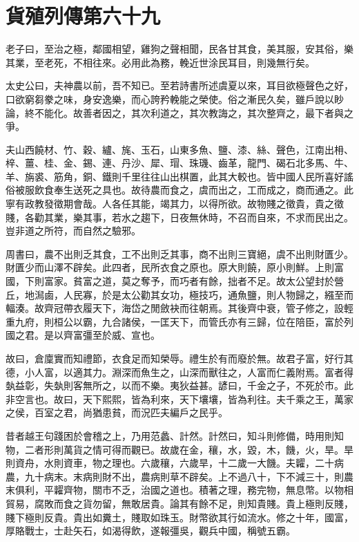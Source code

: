 \chapter{貨殖列傳第六十九}

老子曰，至治之極，鄰國相望，雞狗之聲相聞，民各甘其食，美其服，安其俗，樂其業，至老死，不相往來。必用此為務，輓近世涂民耳目，則幾無行矣。

太史公曰，夫神農以前，吾不知已。至若詩書所述虞夏以來，耳目欲極聲色之好，口欲窮芻豢之味，身安逸樂，而心誇矜輓能之榮使。俗之漸民久矣，雖戶說以眇論，終不能化。故善者因之，其次利道之，其次教誨之，其次整齊之，最下者與之爭。

夫山西饒材、竹、穀、纑、旄、玉石，山東多魚、鹽、漆、絲、聲色，江南出枏、梓、薑、桂、金、錫、連、丹沙、犀、瑁、珠璣、齒革，龍門、碣石北多馬、牛、羊、旃裘、筋角，銅、鐵則千里往往山出棋置，此其大較也。皆中國人民所喜好謠俗被服飲食奉生送死之具也。故待農而食之，虞而出之，工而成之，商而通之。此寧有政教發徵期會哉。人各任其能，竭其力，以得所欲。故物賤之徵貴，貴之徵賤，各勸其業，樂其事，若水之趨下，日夜無休時，不召而自來，不求而民出之。豈非道之所符，而自然之驗邪。

周書曰，農不出則乏其食，工不出則乏其事，商不出則三寶絕，虞不出則財匱少。財匱少而山澤不辟矣。此四者，民所衣食之原也。原大則饒，原小則鮮。上則富國，下則富家。貧富之道，莫之奪予，而巧者有餘，拙者不足。故太公望封於營丘，地澙鹵，人民寡，於是太公勸其女功，極技巧，通魚鹽，則人物歸之，繦至而輻湊。故齊冠帶衣履天下，海岱之閒斂袂而往朝焉。其後齊中衰，管子修之，設輕重九府，則桓公以霸，九合諸侯，一匡天下，而管氏亦有三歸，位在陪臣，富於列國之君。是以齊富彊至於威、宣也。

故曰，倉廩實而知禮節，衣食足而知榮辱。禮生於有而廢於無。故君子富，好行其德，小人富，以適其力。淵深而魚生之，山深而獸往之，人富而仁義附焉。富者得埶益彰，失埶則客無所之，以而不樂。夷狄益甚。諺曰，千金之子，不死於市。此非空言也。故曰，天下熙熙，皆為利來，天下壤壤，皆為利往。夫千乘之王，萬家之侯，百室之君，尚猶患貧，而況匹夫編戶之民乎。

昔者越王句踐困於會稽之上，乃用范蠡、計然。計然曰，知斗則修備，時用則知物，二者形則萬貨之情可得而觀已。故歲在金，穰，水，毀，木，饑，火，旱。旱則資舟，水則資車，物之理也。六歲穰，六歲旱，十二歲一大饑。夫糶，二十病農，九十病末。末病則財不出，農病則草不辟矣。上不過八十，下不減三十，則農末俱利，平糶齊物，關市不乏，治國之道也。積著之理，務完物，無息幣。以物相貿易，腐敗而食之貨勿留，無敢居貴。論其有餘不足，則知貴賤。貴上極則反賤，賤下極則反貴。貴出如糞土，賤取如珠玉。財幣欲其行如流水。修之十年，國富，厚賂戰士，士赴矢石，如渴得飲，遂報彊吳，觀兵中國，稱號五霸。

